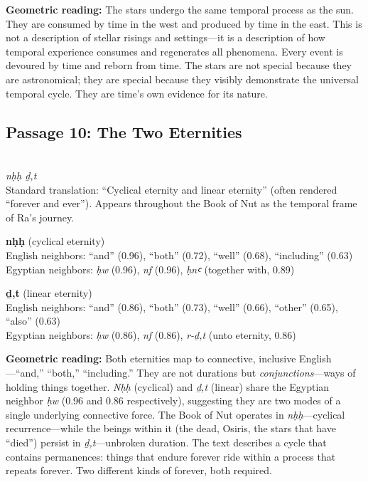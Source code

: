 \documentclass[11pt, a4paper]{article}
\newcommand{\passagehiero}[1]{{\normalfont\hierofont\fontsize{14}{17}\selectfont #1}}
\begin{document}
\medskip

{\color{insight}\textbf{Geometric reading:}} The stars undergo the same temporal process as the sun. They are consumed by time in the west and produced by time in the east. This is not a description of stellar risings and settings---it is a description of how temporal experience consumes and regenerates all phenomena. Every event is devoured by time and reborn from time. The stars are not special because they are astronomical; they are special because they visibly demonstrate the universal temporal cycle. They are time's own evidence for its nature.

\subsection{Passage 10: The Two Eternities}

{\color{passage}\passagehiero{𓎛𓇳𓎛 𓆓𓏏}\\\medskip
\textit{\small nḥḥ ḏ,t}\\
Standard translation: ``Cyclical eternity and linear eternity'' (often rendered ``forever and ever'').\newline
Appears throughout the Book of Nut as the temporal frame of Ra's journey.}

\bigskip

\noindent\textbf{nḥḥ} (cyclical eternity)\\
English neighbors: ``and'' (0.96), ``both'' (0.72), ``well'' (0.68), ``including'' (0.63)\\
Egyptian neighbors: \textit{ḥw} (0.96), \textit{nf} (0.96), \textit{ḥnꜥ} (together with, 0.89)

\medskip

\noindent\textbf{ḏ,t} (linear eternity)\\
English neighbors: ``and'' (0.86), ``both'' (0.73), ``well'' (0.66), ``other'' (0.65), ``also'' (0.63)\\
Egyptian neighbors: \textit{ḥw} (0.86), \textit{nf} (0.86), \textit{r-ḏ,t} (unto eternity, 0.86)

\medskip

{\color{insight}\textbf{Geometric reading:}} Both eternities map to connective, inclusive English---``and,'' ``both,'' ``including.'' They are not durations but \textit{conjunctions}---ways of holding things together. \textit{Nḥḥ} (cyclical) and \textit{ḏ,t} (linear) share the Egyptian neighbor \textit{ḥw} (0.96 and 0.86 respectively), suggesting they are two modes of a single underlying connective force. The Book of Nut operates in \textit{nḥḥ}---cyclical recurrence---while the beings within it (the dead, Osiris, the stars that have ``died'') persist in \textit{ḏ,t}---unbroken duration. The text describes a cycle that contains permanences: things that endure forever ride within a process that repeats forever. Two different kinds of forever, both required.
\end{document}
